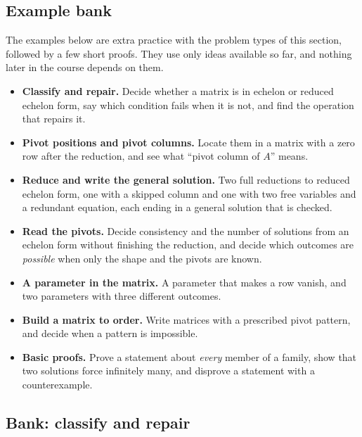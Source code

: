 \documentclass[11pt]{article}
\begin{document}
\subsection*{Example bank}

The examples below are extra practice with the problem types of this section, followed by a few short proofs. They use only ideas available so far, and nothing later in the course depends on them.

\begin{remark}
\begin{itemize}
  \item \textbf{Classify and repair.} Decide whether a matrix is in echelon or reduced echelon form, say which condition fails when it is not, and find the operation that repairs it.
  \item \textbf{Pivot positions and pivot columns.} Locate them in a matrix with a zero row after the reduction, and see what ``pivot column of $A$'' means.
  \item \textbf{Reduce and write the general solution.} Two full reductions to reduced echelon form, one with a skipped column and one with two free variables and a redundant equation, each ending in a general solution that is checked.
  \item \textbf{Read the pivots.} Decide consistency and the number of solutions from an echelon form without finishing the reduction, and decide which outcomes are \emph{possible} when only the shape and the pivots are known.
  \item \textbf{A parameter in the matrix.} A parameter that makes a row vanish, and two parameters with three different outcomes.
  \item \textbf{Build a matrix to order.} Write matrices with a prescribed pivot pattern, and decide when a pattern is impossible.
  \item \textbf{Basic proofs.} Prove a statement about \emph{every} member of a family, show that two solutions force infinitely many, and disprove a statement with a counterexample.
\end{itemize}
\end{remark}

\subsection*{Bank: classify and repair}
\end{document}
